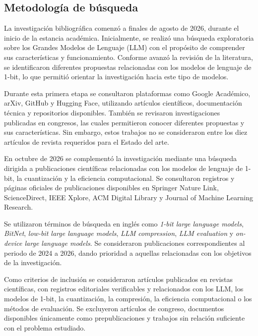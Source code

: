 
\subsection{Metodología de búsqueda}

La investigación bibliográfica comenzó a finales de agosto de 2026, durante el inicio de la estancia académica. Inicialmente, se realizó una búsqueda exploratoria sobre los Grandes Modelos de Lenguaje (LLM) con el propósito de comprender sus características y funcionamiento. Conforme avanzó la revisión de la literatura, se identificaron diferentes propuestas relacionadas con los modelos de lenguaje de 1-bit, lo que permitió orientar la investigación hacia este tipo de modelos.

Durante esta primera etapa se consultaron plataformas como Google Académico, arXiv, GitHub y Hugging Face, utilizando artículos científicos, documentación técnica y repositorios disponibles. También se revisaron investigaciones publicadas en congresos, las cuales permitieron conocer diferentes propuestas y sus características. Sin embargo, estos trabajos no se consideraron entre los diez artículos de revista requeridos para el Estado del arte.

En octubre de 2026 se complementó la investigación mediante una búsqueda dirigida a publicaciones científicas relacionadas con los modelos de lenguaje de 1-bit, la cuantización y la eficiencia computacional. Se consultaron registros y páginas oficiales de publicaciones disponibles en Springer Nature Link, ScienceDirect, IEEE Xplore, ACM Digital Library y Journal of Machine Learning Research.

Se utilizaron términos de búsqueda en inglés como \textit{1-bit large language models}, \textit{BitNet}, \textit{low-bit large language models}, \textit{LLM compression}, \textit{LLM evaluation} y \textit{on-device large language models}. Se consideraron publicaciones correspondientes al periodo de 2024 a 2026, dando prioridad a aquellas relacionadas con los objetivos de la investigación.

Como criterios de inclusión se consideraron artículos publicados en revistas científicas, con registros editoriales verificables y relacionados con los LLM, los modelos de 1-bit, la cuantización, la compresión, la eficiencia computacional o los métodos de evaluación. Se excluyeron artículos de congreso, documentos disponibles únicamente como prepublicaciones y trabajos sin relación suficiente con el problema estudiado.

